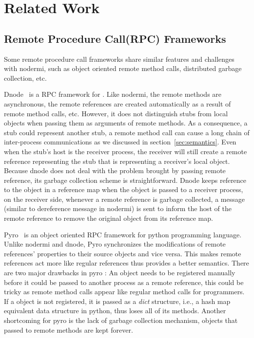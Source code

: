 \chapter{Related Work}

\section{Remote Procedure Call(RPC) Frameworks}
\label{sec:relatedrpc}
Some remote procedure call frameworks share similar features and challenges 
with nodermi, such as object oriented remote method calls,
distributed garbage collection, etc.

Dnode~\cite{dnode} is a RPC framework for \nodejs{}. 
Like nodermi, the remote methods are asynchronous, the remote references are created
automatically as a result of remote method calls, etc.
However, it does not distinguish stubs from local objects 
when passing them as arguments of remote methods.
As a consequence, a stub could represent another stub,
a remote method call can cause a long chain of inter-process communications as
we discussed in section~\ref{sec:semantics}.
Even when the stub's host is the receiver process,
the receiver will still create a remote reference
representing the stub that is representing a receiver's local object.
Because dnode does not deal with 
the problem brought by passing remote reference,
its garbage collection scheme is straightforward.
Dnode keeps reference to the object in a reference map when the object
 is passed to a receiver process,
on the receiver side,
whenever a remote reference is garbage collected, 
a  message (similar to dereference message in nodermi) 
is sent to inform the host of the remote reference
 to remove the original object from its reference map.

 
Pyro~\cite{pyro} is an object oriented RPC framework for python programming language.
Unlike nodermi and dnode,
Pyro synchronizes the modifications of remote references' properties to their source 
objects and vice versa.
This makes remote references act more like regular references thus
provides a better semantics.
There are two major drawbacks in pyro :
An object needs to be registered manually
before it could be passed to another process as a remote reference,
this could be tricky as remote method calls appear like regular method calls for 
programmers.
If a object is not registered,
it is passed as a \emph{dict} structure, i.e., 
a hash map equivalent data structure in python,
thus loses all of its methods.
Another shortcoming for pyro is the lack of garbage collection mechanism, 
objects that passed to remote methods are kept forever.



